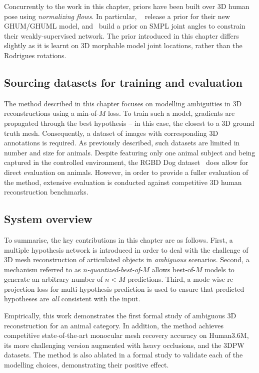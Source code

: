 Concurrently to the work in this chapter, priors have been built over 3D human pose using \emph{normalizing flows}. In particular, ~\cite{xu-2020-cvpr} release a prior for their new GHUM/GHUML model, and~\cite{weakly-supervised-normflow} build a prior on SMPL joint angles to constrain their weakly-supervised network. The prior introduced in this chapter differs slightly as it is learnt on 3D morphable model joint locations, rather than the Rodrigues rotations.



\subsection{Sourcing datasets for training and evaluation}

The method described in this chapter focuses on modelling ambiguities in 3D reconstructions using a min-of-$M$ loss. To train such a model, gradients are propagated through the best hypothesis -- in this case, the closest to a 3D ground truth mesh. Consequently, a dataset of images with corresponding 3D annotations is required. As previously described, such datasets are limited in number and size for animals. Despite featuring only one animal subject and being captured in the controlled environment, the RGBD Dog dataset~\cite{xxx} does allow for direct evaluation on animals. However, in order to provide a fuller evaluation of the method, extensive evaluation is conducted against competitive 3D human reconstruction benchmarks.

\subsection{System overview}
To summarise, the key contributions in this chapter are as follows.
First, a multiple hypothesis network is introduced in order to deal with the challenge of 3D mesh reconstruction of articulated objects in \emph{ambiguous} scenarios.
Second, a mechanism referred to as \emph{$n$-quantized-best-of-$M$} allows best-of-$M$ models to generate an arbitrary number of $n<M$ predictions.
Third, a mode-wise re-projection loss for multi-hypothesis prediction is used to ensure that predicted hypotheses are \emph{all} consistent with the input.

Empirically, this work demonstrates the first formal study of ambiguous 3D reconstruction for an animal category. In addition, the method achieves competitive state-of-the-art monocular mesh recovery accuracy on Human3.6M, its more challenging version augmented with heavy occlusions, and the 3DPW datasets. 
The method is also ablated in a formal study to validate each of the modelling choices, demonstrating their positive effect.

